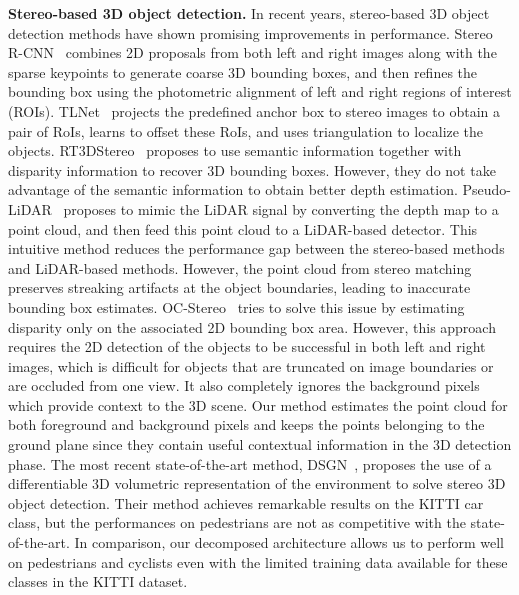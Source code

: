 \documentclass[letterpaper, 10 pt, conference]{ieeeconf}
\begin{document}
\noindent \textbf{Stereo-based 3D object detection.}
In recent years, stereo-based 3D object detection methods have shown promising improvements in performance. Stereo R-CNN~\cite{li2019stereo} combines 2D proposals from both left and right images along with the sparse keypoints to generate coarse 3D bounding boxes, and then refines the bounding box using the photometric alignment of left and right regions of interest (ROIs). TLNet~\cite{qin2019triangulation} projects the predefined anchor box to stereo images to obtain a pair of RoIs, learns to offset these RoIs, and uses triangulation to localize the objects. RT3DStereo~\cite{konigshof2019realtime} proposes to use semantic information together with disparity information to recover 3D bounding boxes. However, they do not take advantage of the semantic information to obtain better depth estimation. Pseudo-LiDAR~\cite{wang2019pseudo, you2019pseudo} proposes to mimic the LiDAR signal by converting the depth map to a point cloud, and then feed this point cloud to a LiDAR-based detector. This intuitive method reduces the performance gap between the stereo-based methods and LiDAR-based methods. However, the point cloud from stereo matching preserves streaking artifacts at the object boundaries, leading to inaccurate bounding box estimates. OC-Stereo~\cite{pon2019object} tries to solve this issue by estimating disparity only on the associated 2D bounding box area. However, this approach requires the 2D detection of the objects to be successful in both left and right images, which is difficult for objects that are truncated on image boundaries or are occluded from one view. It also completely ignores the background pixels which provide context to the 3D scene. Our method estimates the point cloud for both foreground and background pixels and keeps the points belonging to the ground plane since they contain useful contextual information in the 3D detection phase. The most recent state-of-the-art method, DSGN~\cite{chen2020dsgn}, proposes the use of a differentiable 3D volumetric representation of the environment to solve stereo 3D object detection. Their method achieves remarkable results on the KITTI car class, but the performances on pedestrians are not as competitive with the state-of-the-art. In comparison, our decomposed architecture allows us to perform well on pedestrians and cyclists even with the limited training data available for these classes in the KITTI dataset.    \\
\end{document}
